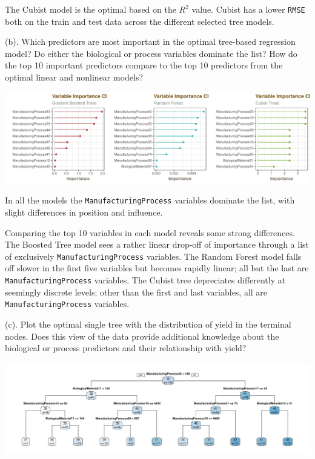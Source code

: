 \documentclass[]{report}
\begin{document}
The Cubist model is the optimal based on the \(R^2\) value. Cubist has a
lower \texttt{RMSE} both on the train and test data across the different
selected tree models.

\begin{subquestion}{(b).} Which predictors are most important in the optimal tree-based regression model? Do either the biological or process variables dominate the list? How do the top 10 important predictors compare to the top 10 predictors from the optimal linear and nonlinear models?\end{subquestion}

\includegraphics{Homework-Two2_files/figure-latex/kj-8.7b-1.pdf}

In all the models the \texttt{ManufacturingProcess} variables dominate
the list, with slight differences in position and influence.

Comparing the top 10 variables in each model reveals some strong
differences. The Boosted Tree model sees a rather linear drop-off of
importance through a list of exclusively \texttt{ManufacturingProcess}
variables. The Random Forest model falls off slower in the first five
variables but becomes rapidly linear; all but the last are
\texttt{ManufacturingProcess} variables. The Cubist tree depreciates
differently at seemingly discrete levels; other than the first and last
variables, all are \texttt{ManufacturingProcess} variables.

\begin{subquestion}{(c).} Plot the optimal single tree with the distribution of yield in the terminal nodes. Does this view of the data provide additional knowledge about the biological or process predictors and their relationship with yield?\end{subquestion}

\includegraphics{Homework-Two2_files/figure-latex/kj-8.7c-1.pdf}
\end{document}

